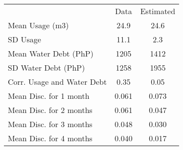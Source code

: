 \begin{tabular}{lcc}
& Data & Estimated \\
Mean Usage (m3) &24.9&24.6\\
SD Usage &11.1&2.3\\
Mean Water Debt (PhP) &1205&1412\\
SD Water Debt (PhP) &1258&1955\\
Corr. Usage and Water Debt &0.35&0.05\\
Mean Disc. for 1 month &0.061&0.073\\
Mean Disc. for 2 months &0.061&0.047\\
Mean Disc. for 3 months &0.048&0.030\\
Mean Disc. for 4 months &0.040&0.017\\
\end{tabular} 
